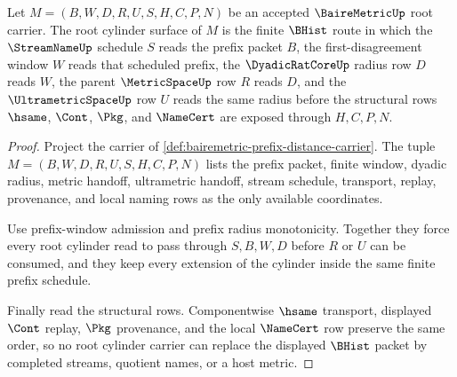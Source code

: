 \begin{theorem}
\label{thm:bairemetric-root-ultrametric-cylinder-carrier}
Let $M=(B,W,D,R,U,S,H,C,P,N)$ be an accepted $\BaireMetricUp$ root carrier. The root cylinder surface of $M$ is the finite $\BHist$ route in which the $\StreamNameUp$ schedule $S$ reads the prefix packet $B$, the first-disagreement window $W$ reads that scheduled prefix, the $\DyadicRatCoreUp$ radius row $D$ reads $W$, the parent $\MetricSpaceUp$ row $R$ reads $D$, and the $\UltrametricSpaceUp$ row $U$ reads the same radius before the structural rows $\hsame$, $\Cont$, $\Pkg$, and $\NameCert$ are exposed through $H,C,P,N$.
\end{theorem}
\begin{proof}
Project the carrier of \autoref{def:bairemetric-prefix-distance-carrier}. The tuple $M=(B,W,D,R,U,S,H,C,P,N)$ lists the prefix packet, finite window, dyadic radius, metric handoff, ultrametric handoff, stream schedule, transport, replay, provenance, and local naming rows as the only available coordinates.

Use prefix-window admission and prefix radius monotonicity. Together they force every root cylinder read to pass through $S,B,W,D$ before $R$ or $U$ can be consumed, and they keep every extension of the cylinder inside the same finite prefix schedule.

Finally read the structural rows. Componentwise $\hsame$ transport, displayed $\Cont$ replay, $\Pkg$ provenance, and the local $\NameCert$ row preserve the same order, so no root cylinder carrier can replace the displayed $\BHist$ packet by completed streams, quotient names, or a host metric.
\end{proof}

